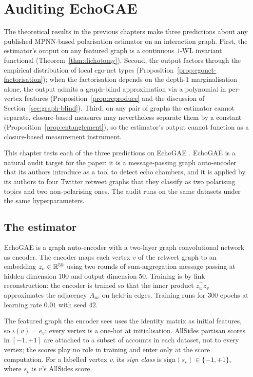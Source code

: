 
\section{Auditing EchoGAE}\label{sec:emp-reddit}

The theoretical results in the previous chapters make three
predictions about any published MPNN-based polarisation estimator on
an interaction graph. First, the estimator's output on any featured
graph is a continuous $1$-WL invariant functional
(Theorem~\ref{thm:dichotomy}). Second, the output factors through the
empirical distribution of local ego-net types
(Proposition~\ref{prop:egonet-factorisation}); when the factorisation depends
on the depth-$1$ marginalisation alone, the output admits a
graph-blind approximation via a polynomial in per-vertex features
(Proposition~\ref{prop:reproduce} and the discussion of
Section~\ref{sec:graph-blind}). Third, on any pair of graphs the estimator
cannot separate, closure-based measures may nevertheless separate
them by a constant (Proposition~\ref{prop:entanglement}), so the estimator's
output cannot function as a closure-based measurement instrument.

This chapter tests each of the three predictions on EchoGAE
\citep{Alatawi23EchoGAE}. EchoGAE is a natural audit target for the
paper: it is a message-passing graph auto-encoder that its authors
introduce as a tool to detect echo chambers, and it is applied by
its authors to four Twitter retweet graphs that they classify as two
polarising topics and two non-polarising ones. The audit runs on the
same datasets under the same hyperparameters.

\subsection{The estimator}

EchoGAE is a graph auto-encoder with a two-layer graph convolutional
network as encoder. The encoder maps each vertex $v$ of the retweet
graph to an embedding $z_v \in \mathbb{R}^{50}$ using two rounds of
sum-aggregation message passing at hidden dimension $100$ and output
dimension $50$. Training is by link reconstruction: the encoder is
trained so that the inner product $z_u^\top z_v$ approximates the
adjacency $A_{uv}$ on held-in edges. Training runs for $300$ epochs
at learning rate $0.01$ with seed $42$.

The featured graph the encoder sees uses the identity matrix as
initial features, so $\iota(v) = e_v$: every vertex is a one-hot at
initialisation. AllSides partisan scores in $[-1, +1]$
\citep{AllSidesMethods} are attached to a subset of accounts in
each dataset, not to every vertex; the scores play no role in
training and enter only at the score computation. For a labelled
vertex $v$, its \emph{sign class} is $\mathrm{sign}(s_v) \in \{-1,
+1\}$, where $s_v$ is $v$'s AllSides score.

